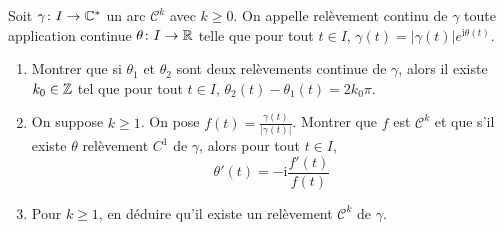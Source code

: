 \documentclass[12pt]{article}
\begin{document}
\begin{exercise}
	Soit $\gamma\colon I\to\mathbb{C}^{*}$ un arc $\mathcal{C}^{k}$ avec $k\geqslant0$. On appelle relèvement continu de $\gamma$ toute application continue $\theta\colon I\to\mathbb{R}$ telle que pour tout $t\in I$, $\gamma(t)=\vert\gamma(t)\vert e^{\mathrm{i}\theta(t)}$.
	\begin{enumerate}
		\item Montrer que si $\theta_{1}$ et $\theta_{2}$ sont deux relèvements continue de $\gamma$, alors il existe $k_{0}\in\mathbb{Z}$ tel que pour tout $t\in I$, $\theta_{2}(t)-\theta_{1}(t)=2k_{0}\pi$.
		\item On suppose $k\geqslant1$. On pose $f(t)=\frac{\gamma(t)}{\vert\gamma(t)\vert}$. Montrer que $f$ est $\mathcal{C}^{k}$ et que s'il existe $\theta$ relèvement $C^{1}$ de $\gamma$, alors pour tout $t\in I$, 
		$$\theta'(t)=-\mathrm{i}\frac{f'(t)}{f(t)}$$
		\item Pour $k\geqslant1$, en déduire qu'il existe un relèvement $\mathcal{C}^{k}$ de $\gamma$.
	\end{enumerate}
\end{exercise}
\end{document}
